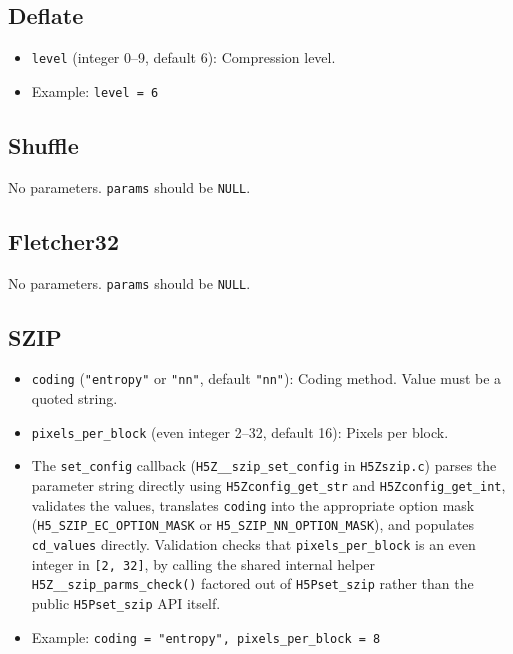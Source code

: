 \documentclass[../RFC-HDFG-2026-001.tex]{subfiles}
\begin{document}
\subsection{Deflate}

\begin{itemize}
\item \texttt{level} (integer 0--9, default 6): Compression level.
\item Example: \texttt{level = 6}
\end{itemize}

\subsection{Shuffle}

No parameters. \texttt{params} should be \texttt{NULL}.

\subsection{Fletcher32}

No parameters. \texttt{params} should be \texttt{NULL}.

\subsection{SZIP}

\begin{itemize}
\item \texttt{coding} (\texttt{"entropy"} or \texttt{"nn"}, default \texttt{"nn"}): Coding
  method. Value must be a quoted string.
\item \texttt{pixels\_per\_block} (even integer 2--32, default 16): Pixels per block.
\item The \texttt{set\_config} callback (\texttt{H5Z\_\_szip\_set\_config} in
  \texttt{H5Zszip.c}) parses the parameter string directly using
  \texttt{H5Zconfig\_get\_str} and \texttt{H5Zconfig\_get\_int}, validates the
  values, translates \texttt{coding} into the appropriate option mask
  (\texttt{H5\_SZIP\_EC\_OPTION\_MASK} or \texttt{H5\_SZIP\_NN\_OPTION\_MASK}),
  and populates \texttt{cd\_values} directly.  Validation checks that
  \texttt{pixels\_per\_block} is an even integer in \texttt{[2,~32]}, by calling
  the shared internal helper \texttt{H5Z\_\_szip\_parms\_check()} factored out of
  \texttt{H5Pset\_szip} rather than the public \texttt{H5Pset\_szip} API itself.
\item Example: \texttt{coding = "entropy", pixels\_per\_block = 8}
\end{itemize}
\end{document}
